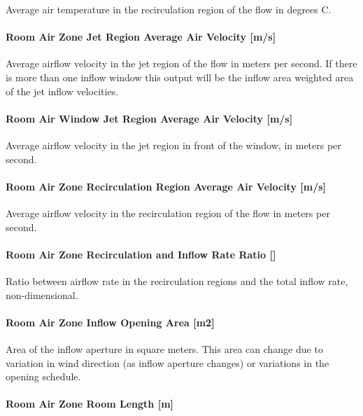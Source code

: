 Average air temperature in the recirculation region of the flow in degrees C.

\paragraph{Room Air Zone Jet Region Average Air Velocity {[}m/s{]}}\label{room-air-zone-jet-region-average-air-velocity-ms}

Average airflow velocity in the jet region of the flow in meters per second. If there is more than one inflow window this output will be the inflow area weighted area of the jet inflow velocities.

\paragraph{Room Air Window Jet Region Average Air Velocity {[}m/s{]}}\label{room-air-window-jet-region-average-air-velocity-ms}

Average airflow velocity in the jet region in front of the window, in meters per second.

\paragraph{Room Air Zone Recirculation Region Average Air Velocity {[}m/s{]}}\label{room-air-zone-recirculation-region-average-air-velocity-ms}

Average airflow velocity in the recirculation region of the flow in meters per second.

\paragraph{Room Air Zone Recirculation and Inflow Rate Ratio {[]}}\label{room-air-zone-recirculation-and-inflow-rate-ratio}

Ratio between airflow rate in the recirculation regions and the total inflow rate, non-dimensional.

\paragraph{Room Air Zone Inflow Opening Area {[}m2{]}}\label{room-air-zone-inflow-opening-area-m2}

Area of the inflow aperture in square meters. This area can change due to variation in wind direction (as inflow aperture changes) or variations in the opening schedule.

\paragraph{Room Air Zone Room Length {[}m{]}}\label{room-air-zone-room-length-m}

